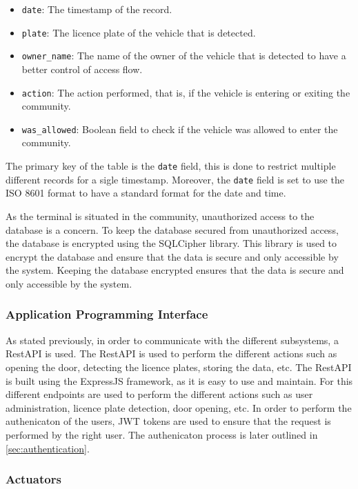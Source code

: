 \begin{itemize}
	\item \texttt{date}: The timestamp of the record.
	\item \texttt{plate}: The licence plate of the vehicle that is detected.
	\item \texttt{owner\_name}: The name of the owner of the vehicle that is detected to have a better control of access flow.
	\item \texttt{action}: The action performed, that is, if the vehicle is entering or exiting the community.
	\item \texttt{was\_allowed}: Boolean field to check if the vehicle was allowed to enter the community.
\end{itemize}

The primary key of the table is the \texttt{date} field, this is done to restrict multiple different records for a sigle timestamp. Moreover, the \texttt{date} field is set to use the ISO 8601 format to have a standard format for the date and time.

As the terminal is situated in the community, unauthorized access to the database is a concern. To keep the database secured from unauthorized access, the database is encrypted using the SQLCipher library. This library is used to encrypt the database and ensure that the data is secure and only accessible by the system. Keeping the database encrypted ensures that the data is secure and only accessible by the system.

\subsubsection{Application Programming Interface}

As stated previously, in order to communicate with the different subsystems, a RestAPI is used. The RestAPI is used to perform the different actions such as opening the door, detecting the licence plates, storing the data, etc. The RestAPI is built using the ExpressJS framework, as it is easy to use and maintain. For this different endpoints are used to perform the different actions such as user administration, licence plate detection, door opening, etc. In order to perform the authenicaton of the users, JWT tokens are used to ensure that the request is performed by the right user. The authenicaton process is later outlined in \cref{sec:authentication}.

\subsubsection{Actuators}

